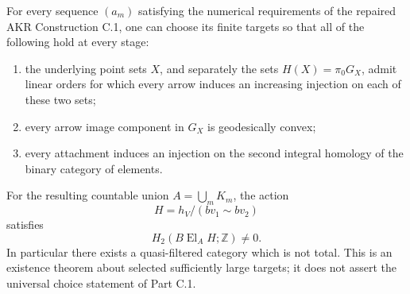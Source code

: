 \begin{theorem}
\label{C:selected-nontotal}
For every sequence $(a_m)$ satisfying the numerical requirements of
the repaired AKR Construction C.1, one can choose its finite targets
so that all of the following hold at every stage:
\begin{enumerate}
\item the underlying point sets $X$, and separately the sets
      $H(X)=\pi_0G_X$, admit linear orders for which every arrow
      induces an increasing injection on each of these two sets;
\item every arrow image component in $G_X$ is geodesically convex;
\item every attachment induces an injection on the second integral
      homology of the binary category of elements.
\end{enumerate}
For the resulting countable union $A=\bigcup_mK_m$, the action
\[
 H=h_V/(bv_1\sim bv_2)
\]
satisfies
\[
 H_2(B\operatorname{El}_A H;\mathbb Z)\ne0.
\]
In particular there exists a quasi-filtered category which is not
total. This is an existence theorem about selected sufficiently
large targets; it does not assert the universal choice statement
of Part C.1.
\end{theorem}

